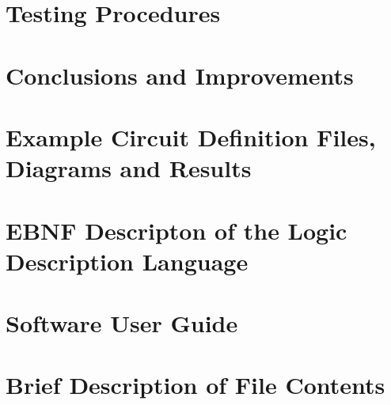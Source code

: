 \documentclass{article}					%
\begin{document}
\section{Testing Procedures}

\section{Conclusions and Improvements}

\newpage
\begin{appendices}
\section{Example Circuit Definition Files, Diagrams and Results}
\section{EBNF Descripton of the Logic Description Language}
\section{Software User Guide}
\section{Brief Description of File Contents}
\end{appendices}
\printbibliography
\end{document}
